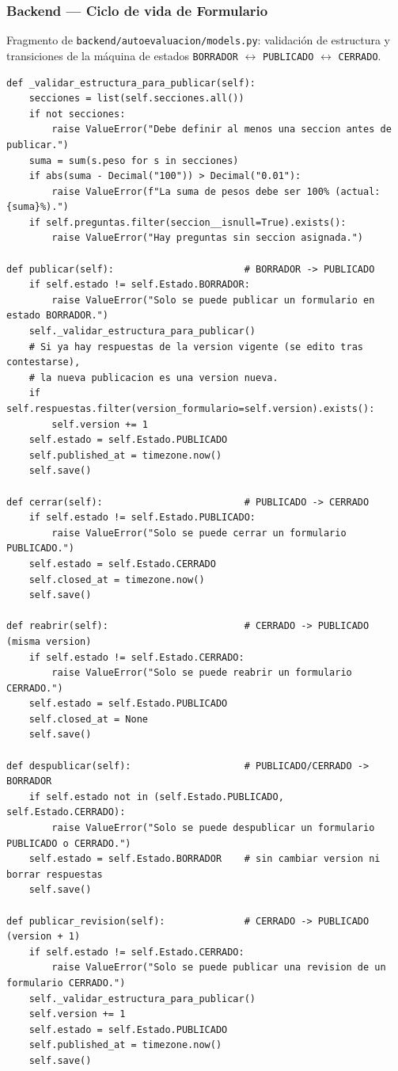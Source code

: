 \subsubsection{Backend --- Ciclo de vida de Formulario}\label{lst:formulario_states}

Fragmento de \texttt{backend/autoevaluacion/models.py}: validación de estructura y transiciones de la máquina de estados \texttt{BORRADOR} $\leftrightarrow$ \texttt{PUBLICADO} $\leftrightarrow$ \texttt{CERRADO}.

\begin{lstlisting}[language={[3]Python}]
def _validar_estructura_para_publicar(self):
    secciones = list(self.secciones.all())
    if not secciones:
        raise ValueError("Debe definir al menos una seccion antes de publicar.")
    suma = sum(s.peso for s in secciones)
    if abs(suma - Decimal("100")) > Decimal("0.01"):
        raise ValueError(f"La suma de pesos debe ser 100% (actual: {suma}%).")
    if self.preguntas.filter(seccion__isnull=True).exists():
        raise ValueError("Hay preguntas sin seccion asignada.")

def publicar(self):                       # BORRADOR -> PUBLICADO
    if self.estado != self.Estado.BORRADOR:
        raise ValueError("Solo se puede publicar un formulario en estado BORRADOR.")
    self._validar_estructura_para_publicar()
    # Si ya hay respuestas de la version vigente (se edito tras contestarse),
    # la nueva publicacion es una version nueva.
    if self.respuestas.filter(version_formulario=self.version).exists():
        self.version += 1
    self.estado = self.Estado.PUBLICADO
    self.published_at = timezone.now()
    self.save()

def cerrar(self):                         # PUBLICADO -> CERRADO
    if self.estado != self.Estado.PUBLICADO:
        raise ValueError("Solo se puede cerrar un formulario PUBLICADO.")
    self.estado = self.Estado.CERRADO
    self.closed_at = timezone.now()
    self.save()

def reabrir(self):                        # CERRADO -> PUBLICADO (misma version)
    if self.estado != self.Estado.CERRADO:
        raise ValueError("Solo se puede reabrir un formulario CERRADO.")
    self.estado = self.Estado.PUBLICADO
    self.closed_at = None
    self.save()

def despublicar(self):                    # PUBLICADO/CERRADO -> BORRADOR
    if self.estado not in (self.Estado.PUBLICADO, self.Estado.CERRADO):
        raise ValueError("Solo se puede despublicar un formulario PUBLICADO o CERRADO.")
    self.estado = self.Estado.BORRADOR    # sin cambiar version ni borrar respuestas
    self.save()

def publicar_revision(self):              # CERRADO -> PUBLICADO (version + 1)
    if self.estado != self.Estado.CERRADO:
        raise ValueError("Solo se puede publicar una revision de un formulario CERRADO.")
    self._validar_estructura_para_publicar()
    self.version += 1
    self.estado = self.Estado.PUBLICADO
    self.published_at = timezone.now()
    self.save()
\end{lstlisting}

